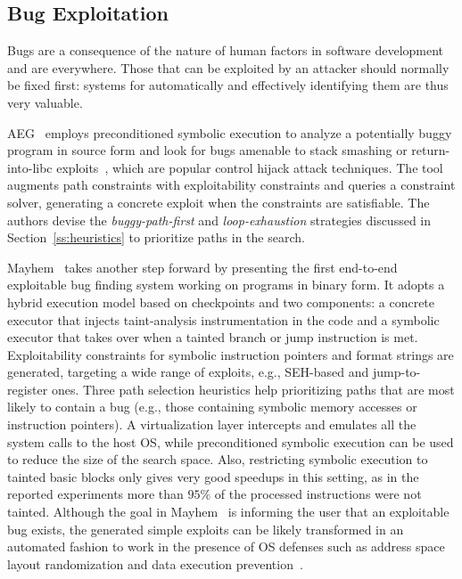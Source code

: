\subsection{Bug Exploitation}
\label{ss:bug-exploitation}
Bugs are a consequence of the nature of human factors in software development and are everywhere. Those that can be exploited by an attacker should normally be fixed first: systems for automatically and effectively identifying them are thus very valuable.

{\sc AEG}~\cite{AEG-NDSS11} employs preconditioned symbolic execution to analyze a potentially buggy program in source form and look for bugs amenable to stack smashing or return-into-libc exploits~\cite{PB-SSP04}, which are popular control hijack attack techniques. The tool augments path constraints with exploitability constraints and queries a constraint solver, generating a concrete exploit when the constraints are satisfiable. The authors devise the {\em buggy-path-first} and {\em loop-exhaustion} strategies discussed in Section~\ref{ss:heuristics} to prioritize paths in the search. 

{\sc Mayhem}~\cite{MAYHEM-SP12} takes another step forward by presenting the first end-to-end exploitable bug finding system working on programs in binary form. It adopts a hybrid execution model based on checkpoints and two components: a concrete executor that injects taint-analysis instrumentation in the code and a symbolic executor that takes over when a tainted branch or jump instruction is met. Exploitability constraints for symbolic instruction pointers and format strings are generated, targeting a wide range of exploits, e.g., SEH-based and jump-to-register ones. Three path selection heuristics help prioritizing paths that are most likely to contain a bug (e.g., those containing symbolic memory accesses or instruction pointers). A virtualization layer intercepts and emulates all the system calls to the host OS, while preconditioned symbolic execution can be used to reduce the size of the search space. Also, restricting symbolic execution to tainted basic blocks only gives very good speedups in this setting, as in the reported experiments more than $95\%$ of the processed instructions were not tainted. Although the goal in {\sc Mayhem}~\cite{MAYHEM-SP12} is informing the user that an exploitable bug exists, the generated simple exploits can be likely transformed in an automated fashion to work in the presence of OS defenses such as address space layout randomization and data execution prevention~\cite{Q-SEC11}. 

